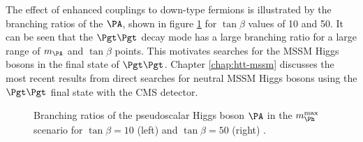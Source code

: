 The effect of enhanced couplings to down-type fermions is illustrated by the
branching ratios of the $\PA$, shown in figure \ref{fig:mhmaxBRs} for $\tan\beta$
values of 10 and 50. It can be seen that the $\Pgt\Pgt$ decay mode has a large
branching ratio for a large range of $m_{\PA}$ and $\tan\beta$ points. This
motivates searches for the \ac{MSSM} Higgs bosons in the final state of $\Pgt\Pgt$. 
Chapter \ref{chap:htt-mssm} discusses the most recent results 
from direct searches for neutral \ac{MSSM} Higgs bosons using the $\Pgt\Pgt$
final state with the CMS detector.

\begin{figure}[htbp]
\caption[Branching ratios of the pseudoscalar Higgs boson $\PA$ in the
$m_{\Ph}^{\text{max}}$ scenario.]{Branching ratios of the pseudoscalar Higgs boson $\PA$ in the
$m_{\Ph}^{\text{max}}$ scenario for $\tan\beta=10$ (left) and $\tan\beta=50$
(right) \cite{Heinemeyer:2013tqa}.}
\label{fig:mhmaxBRs}
\end{figure}

